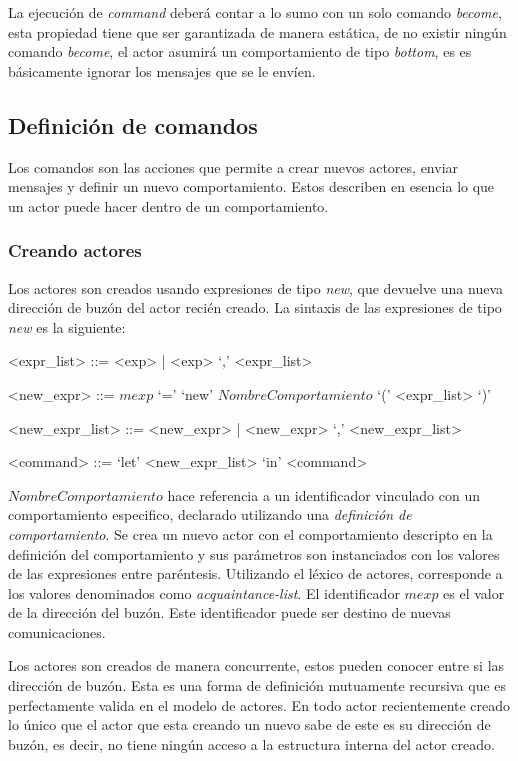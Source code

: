 La ejecución de \textit{command} deberá contar a lo sumo con un solo comando \textit{become}, esta propiedad tiene que ser garantizada de manera estática, de no existir ningún comando \textit{become}, el actor asumirá un comportamiento de tipo \textit{bottom}, es es básicamente ignorar los mensajes que se le envíen.

\subsection{Definición de comandos}\label{actores:cmd}
Los comandos son las acciones que permite a \SAL crear nuevos actores, enviar mensajes y definir un nuevo comportamiento. Estos describen en esencia lo que un actor puede hacer dentro de un comportamiento.

\subsubsection*{Creando actores}
Los actores son creados usando expresiones de tipo \textit{new}, que devuelve una nueva dirección de buzón del actor recién creado. La sintaxis de las expresiones de tipo \textit{new} es la siguiente:

\begin{grammar}
  <expr_list> ::= <exp> | <exp> `,' <expr_list>  
  
  <new_expr> ::= $mexp$ `=' `new' $NombreComportamiento$ `(' <expr_list> `)'
  
  <new_expr_list> ::= <new_expr> | <new_expr> `,' <new_expr_list>
  
  <command> ::=  `let' <new_expr_list> `in' <command> 
\end{grammar}

$NombreComportamiento$ hace referencia a un identificador vinculado con un comportamiento especifico, declarado utilizando una \textit{definición de comportamiento}. Se crea un nuevo actor con el comportamiento descripto en la definición del comportamiento y sus parámetros son instanciados con los valores de las expresiones entre paréntesis. Utilizando el léxico de actores, corresponde a los valores denominados como \textit{acquaintance-list}. El identificador $mexp$ es el valor de la dirección del buzón. Este identificador puede ser destino de nuevas comunicaciones. 

Los actores son creados de manera concurrente, estos pueden conocer entre si las dirección de buzón. Esta es una forma de definición mutuamente recursiva que es perfectamente valida en el modelo de actores. En todo actor recientemente creado lo único que el actor que esta creando un nuevo sabe de este es su dirección de buzón, es decir, no tiene ningún acceso a la estructura interna del actor creado.


